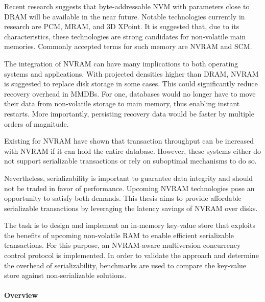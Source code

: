 Recent research suggests that byte-addressable \ac{NVM} with parameters close to
\ac{DRAM} will be available in the near future. Notable technologies currently
in research are \ac{PCM}, \ac{MRAM}, and 3D XPoint. It is suggested that, due to
its characteristics, these technologies are strong candidates for non-volatile
main memories. Commonly accepted terms for such memory are \ac{NVRAM} and
\ac{SCM}.


The integration of \ac{NVRAM} can have many implications to both operating
systems and applications. With projected densities higher than \ac{DRAM},
\ac{NVRAM} is suggested to replace disk storage in some cases. This could
significantly reduce recovery overhead in \acp{MMDB}. For one, databases would
no longer have to move their data from non-volatile storage to main memory, thus
enabling instant restarts. More importantly, persisting recovery data would be
faster by multiple orders of magnitude.

Existing \kvsp for \ac{NVRAM} have shown that transaction throughput can be
increased with \ac{NVRAM} if it can hold the entire database. However, these
systems either do not support serializable transactions or rely on suboptimal
mechanisms to do so.

Nevertheless, serializability is important to guarantee data integrity and
should not be traded in favor of performance. Upcoming NVRAM technologies pose
an opportunity to satisfy both demands. This thesis aims to provide affordable
serializable transactions by leveraging the latency savings of \ac{NVRAM} over
disks.



The task is to design and implement an in-memory key-value store that exploits
the benefits of upcoming non-volatile RAM to enable efficient serializable
transactions. For this purpose, an NVRAM-aware multiversion concurrency control
protocol is implemented. In order to validate the approach and determine the
overhead of serializability, benchmarks are used to compare the key-value store
against non-serializable solutions.


\paragraph{Overview}

